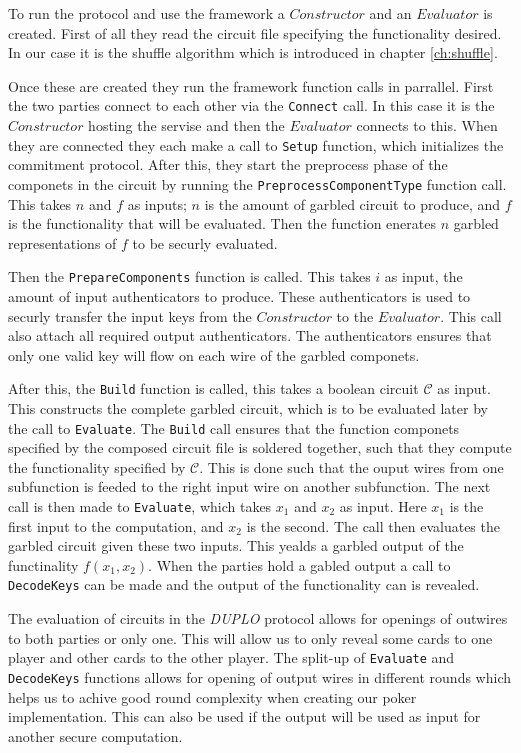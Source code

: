 \documentclass[twoside,11pt,openright]{report}
\newcommand{\DUPLO}{\textit{DUPLO} }
\begin{document}
To run the protocol and use the framework a $Constructor$ and an $Evaluator$ is created. First of all they read the circuit file specifying the functionality desired. In our case it is the shuffle algorithm which is introduced in chapter \ref{ch:shuffle}.

Once these are created they run the framework function calls in parrallel. First the two parties connect to each other via the \verb|Connect| call. In this case it is the $Constructor$ hosting the servise and then the $Evaluator$ connects to this. When they are connected they each make a call to \verb|Setup| function, which initializes the commitment protocol. After this, they start the preprocess phase of the componets in the circuit by running the \verb|PreprocessComponentType| function call. This takes $n$ and $f$ as inputs; $n$ is the amount of garbled circuit to produce, and $f$ is the functionality that will be evaluated. Then the function enerates $n$ garbled representations of $f$ to be securly evaluated.

Then the \verb|PrepareComponents| function is called. This takes $i$ as input, the amount of input authenticators to produce. These authenticators is used to securly transfer the input keys from the $Constructor$ to the $Evaluator$. This call also attach all required output authenticators. The authenticators ensures that only one valid key will flow on each wire of the garbled componets.

After this, the \verb|Build| function is called, this takes a boolean circuit $\mathcal{C}$ as input. This constructs the complete garbled circuit, which is to be evaluated later by the call to \verb|Evaluate|. The \verb|Build| call ensures that the function componets specified by the composed circuit file is soldered together, such that they compute the functionality specified by $\mathcal{C}$. This is done such that the ouput wires from one subfunction is feeded to the right input wire on another subfunction. The next call is then made to \verb|Evaluate|, which takes $x_1$ and $x_2$ as input. Here $x_1$ is the first input to the computation, and $x_2$ is the second. The call then  evaluates the garbled circuit given these two inputs. This yealds a garbled output of the functinality $f(x_1,x_2)$. When the parties hold a gabled output a call to \verb|DecodeKeys| can be made and the output of the functionality can is revealed.

\bigskip

The evaluation of circuits in the \DUPLO protocol allows for openings of outwires to both parties or only one. This will allow us to only reveal some cards to one player and other cards to the other player. The split-up of \verb|Evaluate| and \verb|DecodeKeys| functions allows for opening of output wires in different rounds which helps us to achive good round complexity when creating our poker implementation. This can also be used if the output will be used as input for another secure computation.
\end{document}
